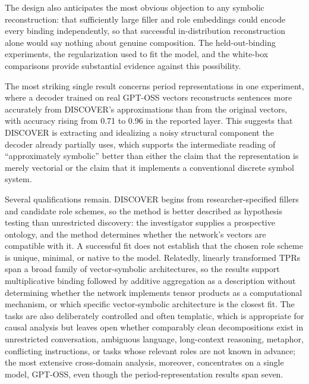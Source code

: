\documentclass[11pt]{article}
\begin{document}
The design also anticipates the most obvious objection to any symbolic reconstruction: that sufficiently large filler and role embeddings could encode every binding independently, so that successful in-distribution reconstruction alone would say nothing about genuine composition. The held-out-binding experiments, the regularization used to fit the model, and the white-box comparisons provide substantial evidence against this possibility.

The most striking single result concerns period representations in one experiment, where a decoder trained on real GPT-OSS vectors reconstructs sentences more accurately from DISCOVER's approximations than from the original vectors, with accuracy rising from 0.71 to 0.96 in the reported layer. This suggests that DISCOVER is extracting and idealizing a noisy structural component the decoder already partially uses, which supports the intermediate reading of ``approximately symbolic'' better than either the claim that the representation is merely vectorial or the claim that it implements a conventional discrete symbol system.

Several qualifications remain. DISCOVER begins from researcher-specified fillers and candidate role schemes, so the method is better described as hypothesis testing than unrestricted discovery: the investigator supplies a prospective ontology, and the method determines whether the network's vectors are compatible with it. A successful fit does not establish that the chosen role scheme is unique, minimal, or native to the model. Relatedly, linearly transformed TPRs span a broad family of vector-symbolic architectures, so the results support multiplicative binding followed by additive aggregation as a description without determining whether the network implements tensor products as a computational mechanism, or which specific vector-symbolic architecture is the closest fit. The tasks are also deliberately controlled and often templatic, which is appropriate for causal analysis but leaves open whether comparably clean decompositions exist in unrestricted conversation, ambiguous language, long-context reasoning, metaphor, conflicting instructions, or tasks whose relevant roles are not known in advance; the most extensive cross-domain analysis, moreover, concentrates on a single model, GPT-OSS, even though the period-representation results span seven.
\end{document}
